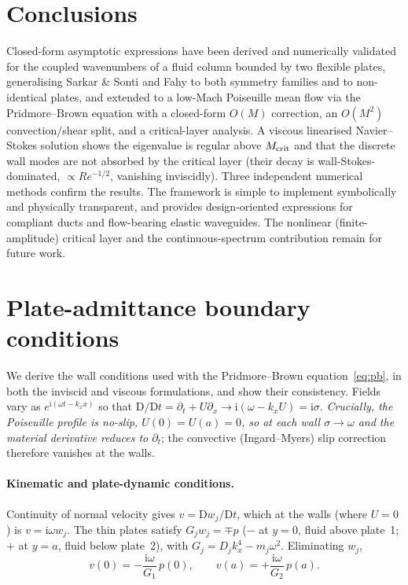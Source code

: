 \documentclass[11pt]{article}
\begin{document}
\section{Conclusions}
Closed-form asymptotic expressions have been derived and numerically validated for the coupled
wavenumbers of a fluid column bounded by two flexible plates, generalising Sarkar \& Sonti and Fahy to
both symmetry families and to non-identical plates, and extended to a low-Mach Poiseuille mean flow via
the Pridmore--Brown equation with a closed-form $O(M)$ correction, an $O(M^2)$ convection/shear split,
and a critical-layer analysis. A viscous linearised Navier--Stokes solution shows the eigenvalue is
regular above $M_{\rm crit}$ and that the discrete wall modes are not absorbed by the critical layer
(their decay is wall-Stokes-dominated, $\propto Re^{-1/2}$, vanishing inviscidly). Three independent
numerical methods confirm the results. The framework is simple to implement symbolically and
physically transparent, and provides design-oriented expressions for compliant ducts and flow-bearing
elastic waveguides. The nonlinear (finite-amplitude) critical layer and the continuous-spectrum
contribution remain for future work.


\appendix
\section{Plate-admittance boundary conditions}\label{app:bc}
We derive the wall conditions used with the Pridmore--Brown equation~\eqref{eq:pb}, in both the
inviscid and viscous formulations, and show their consistency. Fields vary as
$e^{\mathrm{i}(\omega t-k_xx)}$ so that $\mathrm{D}/\mathrm{D}t=\partial_t+U\partial_x\to
\mathrm{i}(\omega-k_xU)=\mathrm{i}\sigma$. \emph{Crucially, the Poiseuille profile is no-slip,
$U(0)=U(a)=0$, so at each wall $\sigma\to\omega$ and the material derivative reduces to $\partial_t$};
the convective (Ingard--Myers) slip correction therefore vanishes at the walls.

\paragraph{Kinematic and plate-dynamic conditions.} Continuity of normal velocity gives
$v=\mathrm{D}w_j/\mathrm{D}t$, which at the walls (where $U=0$) is $v=\mathrm{i}\omega w_j$. The thin
plates satisfy $G_jw_j=\mp p$ ($-$ at $y=0$, fluid above plate~1; $+$ at $y=a$, fluid below plate~2),
with $G_j=D_jk_x^4-m_j\omega^2$. Eliminating $w_j$,
\begin{equation}
v(0)=-\frac{\mathrm{i}\omega}{G_1}\,p(0),\qquad v(a)=+\frac{\mathrm{i}\omega}{G_2}\,p(a).
\label{eq:adm}
\end{equation}
\end{document}
